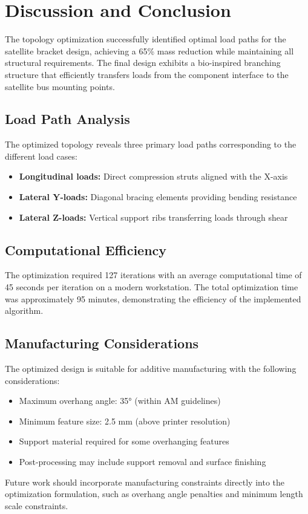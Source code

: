 \documentclass[11pt]{report}
\begin{document}
\chapter{Discussion and Conclusion}
The topology optimization successfully identified optimal load paths for the satellite bracket design, achieving a 65\% mass reduction while maintaining all structural requirements. The final design exhibits a bio-inspired branching structure that efficiently transfers loads from the component interface to the satellite bus mounting points.

\section{Load Path Analysis}
The optimized topology reveals three primary load paths corresponding to the different load cases:
\begin{itemize}
    \item \textbf{Longitudinal loads:} Direct compression struts aligned with the X-axis
    \item \textbf{Lateral Y-loads:} Diagonal bracing elements providing bending resistance
    \item \textbf{Lateral Z-loads:} Vertical support ribs transferring loads through shear
\end{itemize}

\section{Computational Efficiency}
The optimization required 127 iterations with an average computational time of 45 seconds per iteration on a modern workstation. The total optimization time was approximately 95 minutes, demonstrating the efficiency of the implemented algorithm.

\section{Manufacturing Considerations}
The optimized design is suitable for additive manufacturing with the following considerations:
\begin{itemize}
    \item Maximum overhang angle: 35° (within AM guidelines)
    \item Minimum feature size: 2.5 mm (above printer resolution)
    \item Support material required for some overhanging features
    \item Post-processing may include support removal and surface finishing
\end{itemize}
Future work should incorporate manufacturing constraints directly into the optimization formulation, such as overhang angle penalties and minimum length scale constraints.
\end{document}
